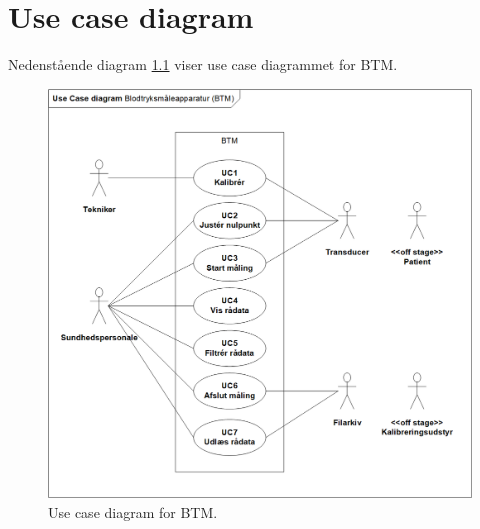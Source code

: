 \chapter{Use case diagram}
Nedenstående diagram \ref{fig:UCdiagram} viser use case diagrammet for BTM. 
\begin{figure}[H]
\includegraphics[scale=0.8]{Billeder/UseCaseDiagram.png}
\centering
\caption{Use case diagram for BTM.}
\label{fig:UCdiagram}
\end{figure}